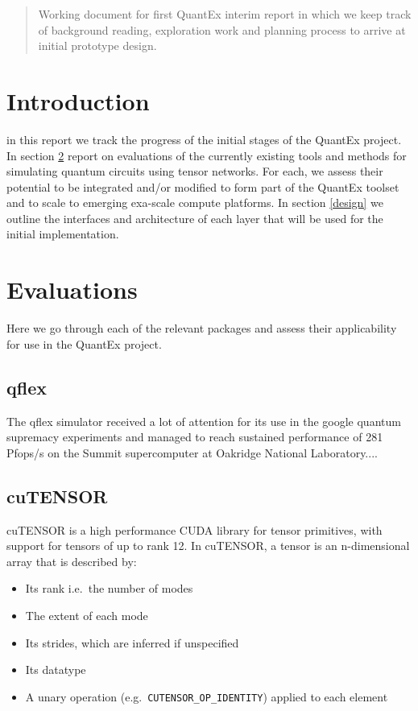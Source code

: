 \documentclass[12pt]{article}
\begin{document}
\maketitle

\begin{abstract}
Working document for first QuantEx interim report in which we keep track of
background reading, exploration work and planning process to arrive at initial
prototype design.
\end{abstract}

\section{Introduction}
in this report we track the progress of the initial stages of the QuantEx project. In section \ref{evaluations} report on evaluations of the currently existing tools and methods for simulating quantum circuits using tensor networks. For each, we assess their potential to be integrated and/or modified to form part of the QuantEx toolset and to scale to emerging exa-scale compute platforms. In section \ref{design} we outline the interfaces and architecture of each layer that will be used for the initial implementation.

\section{Evaluations}\label{evaluations}
Here we go through each of the relevant packages and assess their applicability for use in the QuantEx project.

\subsection{qflex}
The qflex simulator received a lot of attention for its use in the google quantum supremacy experiments \cite{Villalonga2019} and managed to reach sustained performance of 281 Pfops/s on the Summit supercomputer at Oakridge National Laboratory.... 

\subsection{cuTENSOR} \label{cutensor}
cuTENSOR\cite{cuTENSOR} is a high performance CUDA library for tensor primitives, with support for tensors of up to rank 12. In cuTENSOR, a tensor is an n-dimensional array that is described by:

\begin{itemize}
\item Its rank i.e.\ the number of modes
\item The extent of each mode
\item Its strides, which are inferred if unspecified
\item Its datatype
\item A unary operation (e.g.\ \texttt{CUTENSOR\_OP\_IDENTITY}) applied to each element
\end{itemize}
\end{document}
